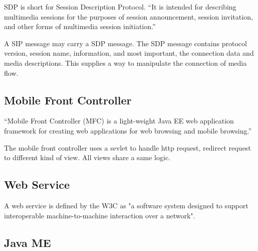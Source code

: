 SDP is short for Session Description Protocol. ``It is intended for describing multimedia sessions for the purposes of session announcement, session invitation, and other forms of multimedia session initiation.''\cite{RFC4566}

A SIP message may carry a SDP message. The SDP message contains protocol version, session name, information, and most important, the connection data and media descriptions. This supplies a way to manipulate the connection of media flow. 

\subsection{Mobile Front Controller}
\label{sec:Solution:InovlvedTechnology:MobileFrontController}
\label{MFC}

``Mobile Front Controller (MFC) is a light-weight Java EE web application framework for creating web applications for web browsing and mobile browsing.'' \cite{MobileFrontController}

The mobile front controller uses a sevlet to handle http request, redirect request to different kind of view. All views share a same logic. 

\subsection{Web Service}
\label{sec:Solution:InovlvedTechnology:WebService}

A web service is defined by the W3C as "a software system designed to support interoperable machine-to-machine interaction over a network".\cite{WebServicesGlossary}

\subsection{Java ME}
\label{sec:Solution:InovlvedTechnology:JavaME}


